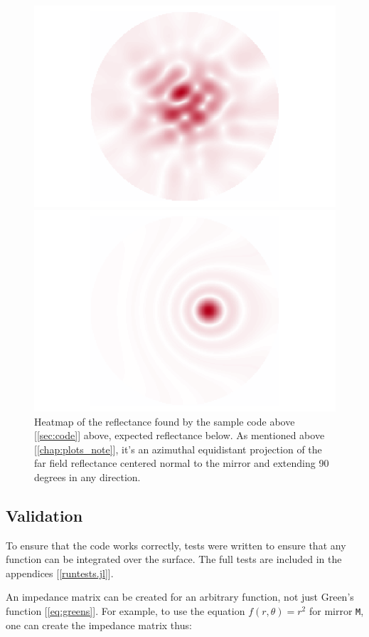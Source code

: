 \documentclass[etd,twoside,senior]{BYUPhys}
\begin{document}
\begin{figure}
  \centerline{\includegraphics[width=.7\textwidth]{sample-reflectance}}
  \centerline{\includegraphics[width=.7\textwidth]{sample-reflectance-expected}}
  \caption[Heatmap from the above sample code]{\label{fig:sample_heatmap}
    Heatmap of the reflectance found by the sample code above [\ref{sec:code}] above, expected reflectance below. As mentioned above [\ref{chap:plots_note}], it's an azimuthal equidistant projection of the far field reflectance centered normal to the mirror and extending 90 degrees in any direction.}
\end{figure}



\subsection{Validation} \label{sec:validation}

To ensure that the code works correctly, tests were written to ensure that any function can be integrated over the surface. The full tests are included in the appendices [\ref{runtests.jl}].

An impedance matrix can be created for an arbitrary function, not just Green's function [\ref{eq:greens}]. For example, to use the equation $f\left(r, \theta\right) = r^2$ for mirror \texttt{M}, one can create the impedance matrix thus:
\end{document}
